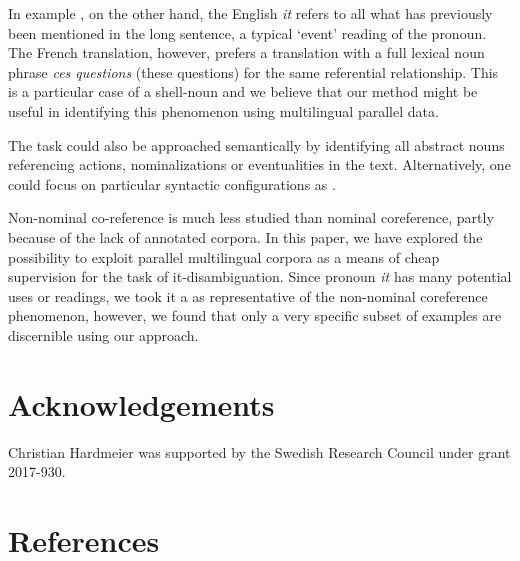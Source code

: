 \documentclass[10pt, a4paper]{article}
\begin{document}
In example \label{ex:shellnoun}, on the other hand, the English \textit{it} 
refers to all what has previously been mentioned in the long sentence, a typical 
`event' reading of the pronoun. The French translation, however, prefers a 
translation with a full lexical noun phrase \textit{ces questions} (these 
questions) for the same referential 
relationship. This is a particular case of a shell-noun 
\cite{kolhatkar-etal-2013-interpreting} and we believe that our method might be useful in identifying this phenomenon using multilingual parallel data. 

The task could also be approached semantically by identifying all abstract
nouns referencing actions, nominalizations or eventualities in the text. Alternatively, one could focus on particular syntactic configurations as
.

Non-nominal co-reference is much less studied than nominal coreference, partly
because of the lack of annotated corpora. In this paper, we have explored the
possibility to exploit parallel multilingual corpora as a means of cheap
supervision for the task of it-disambiguation. Since pronoun \textit{it} has many
potential uses or readings, we took it a as representative of the non-nominal
coreference phenomenon, however, we found that only a very specific subset of examples are discernible using our approach. 

%
%
%
\section{Acknowledgements}
Christian Hardmeier was supported by the Swedish Research Council under grant 2017-930.
%
%
\section{References}

 


\end{document}
